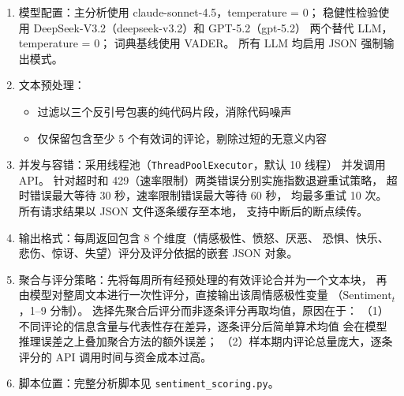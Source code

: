 \documentclass[
    type = master, %
    degree = professional,        %
    decl-page,  %
    twoside,                %
    fontset = fandol %
  ]{njuthesis}
\begin{document}
\begin{enumerate}
  \item 模型配置：主分析使用 claude-sonnet-4.5，temperature = 0；
        稳健性检验使用 DeepSeek-V3.2（deepseek-v3.2）和 GPT-5.2（gpt-5.2）
        两个替代 LLM，temperature = 0；
        词典基线使用 VADER\cite{hutto2014vader}。
        所有 LLM 均启用 JSON 强制输出模式。
  \item 文本预处理：
    \begin{itemize}
      \item 过滤以三个反引号包裹的纯代码片段，消除代码噪声
      \item 仅保留包含至少 5 个有效词的评论，剔除过短的无意义内容
    \end{itemize}
  \item 并发与容错：采用线程池（\texttt{ThreadPoolExecutor}，默认 10 线程）
        并发调用 API。
        针对超时和 429（速率限制）两类错误分别实施指数退避重试策略，
        超时错误最大等待 30 秒，速率限制错误最大等待 60 秒，
        均最多重试 10 次。所有请求结果以 JSON 文件逐条缓存至本地，
        支持中断后的断点续传。
  \item 输出格式：每周返回包含 8 个维度（情感极性、愤怒、厌恶、
        恐惧、快乐、悲伤、惊讶、失望）评分及评分依据的嵌套 JSON 对象。
  \item 聚合与评分策略：先将每周所有经预处理的有效评论合并为一个文本块，
        再由模型对整周文本进行一次性评分，直接输出该周情感极性变量
        （$\text{Sentiment}_t$，1--9 分制）。
        选择先聚合后评分而非逐条评分再取均值，原因在于：
        （1）不同评论的信息含量与代表性存在差异，逐条评分后简单算术均值
        会在模型推理误差之上叠加聚合方法的额外误差；
        （2）样本期内评论总量庞大，逐条评分的 API 调用时间与资金成本过高。
  \item 脚本位置：完整分析脚本见 \texttt{sentiment\_scoring.py}。
\end{enumerate}
\end{document}
